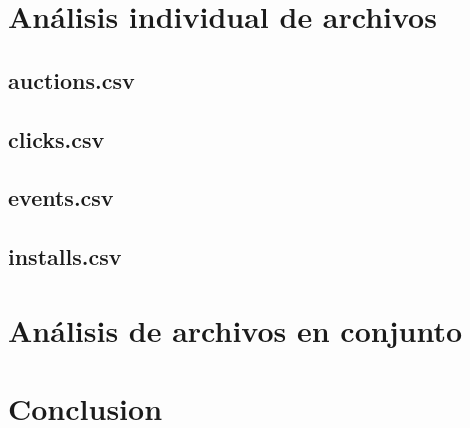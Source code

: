 \documentclass{article}
\begin{document}
\section{Análisis individual de archivos}

\subsection{auctions.csv}

\subsection{clicks.csv}

\subsection{events.csv}

\subsection{installs.csv}

\section{Análisis de archivos en conjunto}

\section{Conclusion}




\end{document}
